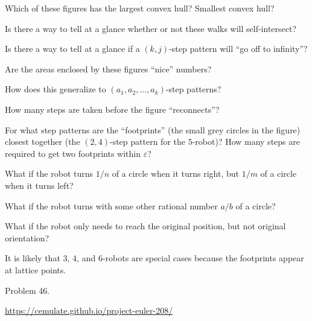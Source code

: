 \documentclass{article}
\begin{document}
\begin{related}
  \item Which of these figures has the largest convex hull? Smallest convex hull?
  \item Is there a way to tell at a glance whether or not these walks will
    self-intersect?
  \item Is there a way to tell at a glance if a $(k,j)$-step pattern will
    ``go off to infinity''?
  \item Are the areas enclosed by these figures ``nice'' numbers?
  \item How does this generalize to $(a_1, a_2, \hdots, a_k)$-step patterns?
  \item How many steps are taken before the figure ``reconnects''?
  \item For what step patterns are the ``footprints'' (the small grey circles
    in the figure) closest together (the $(2, 4)$-step pattern for the
    $5$-robot)?
    How many steps are required to get two footprints within $\varepsilon$?
  \item What if the robot turns $1/n$ of a circle when it turns right, but
    $1/m$ of a circle when it turns left?
  \item What if the robot turns with some other rational number $a/b$ of a
    circle?
  \item What if the robot only needs to reach the original position, but
    not original orientation?
\end{related}
\begin{note}
  It is likely that $3$, $4$, and $6$-robots are special cases because the
  footprints appear at lattice points.
\end{note}
\begin{references}
  \item Problem 46.
  \item \url{https://cemulate.github.io/project-euler-208/}
\end{references}
\end{document}
